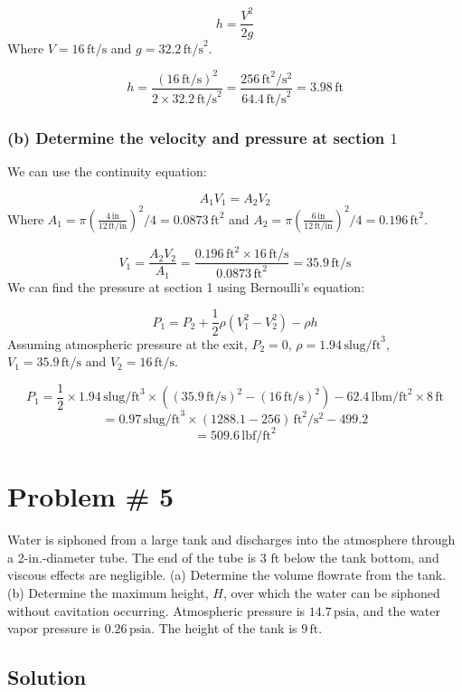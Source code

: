 \documentclass{article}
\begin{document}
\[
h = \frac{V^2}{2g}
\]
Where \( V = 16 \, \text{ft/s} \) and \( g = 32.2 \, \text{ft/s}^2 \).

\[
h = \frac{(16 \, \text{ft/s})^2}{2 \times 32.2 \, \text{ft/s}^2} = \frac{256 \, \text{ft}^2/\text{s}^2}{64.4 \, \text{ft/s}^2} = 3.98 \, \text{ft}
\]

\subsubsection*{(b) Determine the velocity and pressure at section \( 1 \)}
We can use the continuity equation:

\[
A_1 V_1 = A_2 V_2
\]
Where \( A_1 = \pi \left( \frac{4 \, \text{in}}{12 \, \text{ft/in}} \right)^2 / 4 = 0.0873 \, \text{ft}^2 \) and \( A_2 = \pi \left( \frac{6 \, \text{in}}{12 \, \text{ft/in}} \right)^2 / 4 = 0.196 \, \text{ft}^2 \).

\[
V_1 = \frac{A_2 V_2}{A_1} = \frac{0.196 \, \text{ft}^2 \times 16 \, \text{ft/s}}{0.0873 \, \text{ft}^2} = 35.9 \, \text{ft/s}
\]
\newline\newline
We can find the pressure at section 1 using Bernoulli's equation:

\[
P_1 = P_2 + \frac{1}{2} \rho (V_1^2 - V_2^2) - \rho h
\]
Assuming atmospheric pressure at the exit, \( P_2 = 0 \), \( \rho = 1.94 \, \text{slug/ft}^3 \), \( V_1 = 35.9 \, \text{ft/s} \) and \( V_2 = 16 \, \text{ft/s} \).

\[
P_1 = \frac{1}{2} \times 1.94 \, \text{slug/ft}^3 \times ( (35.9 \, \text{ft/s})^2 - (16 \, \text{ft/s})^2 ) - 62.4 \, \text{lbm/ft}^2 \times 8 \, \text{ft}
\]
\[
= 0.97 \, \text{slug/ft}^3 \times (1288.1 - 256) \, \text{ft}^2/\text{s}^2 - 499.2 
\]
\[
= 509.6 \, \text{lbf/ft}^2
\]
\newpage
\section*{Problem \# 5}

Water is siphoned from a large tank and discharges into the atmosphere through a 2-in.-diameter tube. The end of the tube is 3 ft below the tank bottom, and viscous effects are negligible. (a) Determine the volume flowrate from the tank. (b) Determine the maximum height, \(H\), over which the water can be siphoned without cavitation occurring. Atmospheric pressure is \(14.7 \, \text{psia}\), and the water vapor pressure is \(0.26 \, \text{psia}\). The height of the tank is \(9 \, \text{ft}\).

\subsection*{Solution}
\end{document}
